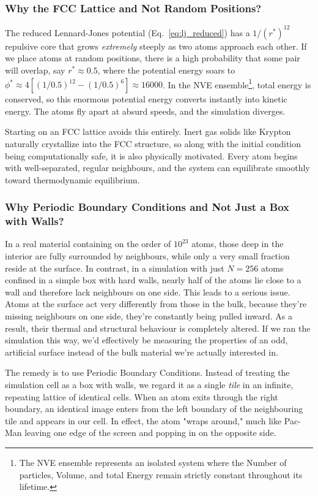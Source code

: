 \subsubsection{Why the FCC Lattice and Not Random Positions?}

The reduced Lennard-Jones potential (Eq.~\eqref{eq:lj_reduced}) has a $1/(r^*)^{12}$ repulsive core that grows \emph{extremely} steeply as two atoms approach each other. If we place atoms at random positions, there is a high probability that some pair will overlap, say $r^* \approx 0.5$, where the potential energy soars to $\phi^* \approx 4[(1/0.5)^{12} - (1/0.5)^6] \approx 16000$. In the NVE ensemble\footnote{The NVE ensemble represents an isolated system where the Number of particles, Volume, and total Energy remain strictly constant throughout its lifetime.}, total energy is conserved, so this enormous potential energy converts instantly into kinetic energy. The atoms fly apart at absurd speeds, and the simulation diverges.

Starting on an FCC lattice avoids this entirely. Inert gas solids like Krypton naturally crystallize into the FCC structure, so along with the initial condition being computationally safe, it is also physically motivated. Every atom begins with well-separated, regular neighbours, and the system can equilibrate smoothly toward thermodynamic equilibrium.

\subsubsection{Why Periodic Boundary Conditions and Not Just a Box with Walls?}

In a real material containing on the order of $10^{23}$ atoms, those deep in the interior are fully surrounded by neighbours, while only a very small fraction reside at the surface. In contrast, in a simulation with just $N = 256$ atoms confined in a simple box with hard walls, nearly half of the atoms lie close to a wall and therefore lack neighbours on one side. This leads to a serious issue. Atoms at the surface act very differently from those in the bulk, because they're missing neighbours on one side, they're constantly being pulled inward. As a result, their thermal and structural behaviour is completely altered. If we ran the simulation this way, we'd effectively be measuring the properties of an odd, artificial surface instead of the bulk material we're actually interested in.

The remedy is to use Periodic Boundary Conditions. Instead of treating the simulation cell as a box with walls, we regard it as a single \emph{tile} in an infinite, repeating lattice of identical cells. When an atom exits through the right boundary, an identical image enters from the left boundary of the neighbouring tile and appears in our cell. In effect, the atom "wraps around," much like Pac-Man leaving one edge of the screen and popping in on the opposite side.

